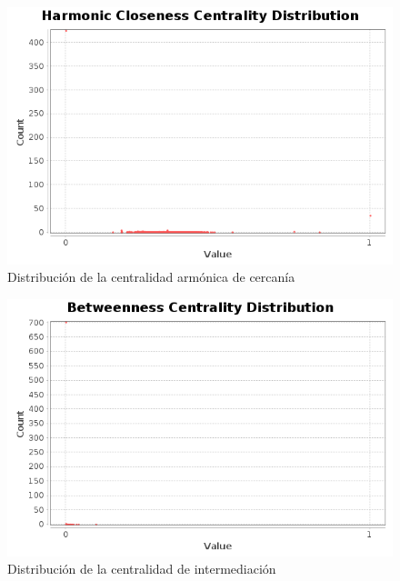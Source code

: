 \begin{figure}
    \includegraphics[width=\textwidth]{images/plots/harmonic-closeness-centrality-distribution.png}
    \caption{Distribución de la centralidad armónica de cercanía}
    \label{fig:harmonic-closeness-centrality-distribution}
\end{figure}

\begin{figure}
    \includegraphics[width=\textwidth]{images/plots/betweenness-centrality-distribution.png}
    \caption{Distribución de la centralidad de intermediación}
    \label{fig:betweenness-centrality-distribution}
\end{figure}

